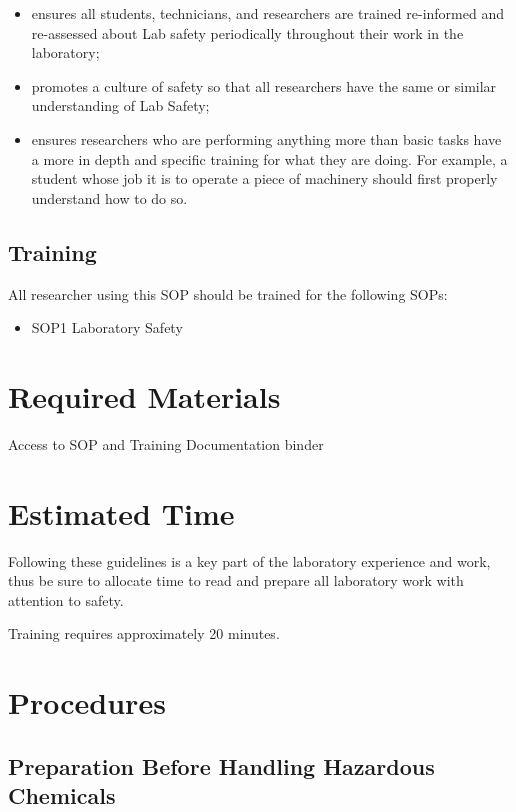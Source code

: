 \documentclass[12pt]{../SOP4_alpha}\usepackage[]{graphicx}\usepackage[]{color}
\begin{document}
\begin{itemize}
  \item ensures all students, technicians, and researchers are trained re-informed and re-assessed about Lab safety periodically throughout their work in the laboratory;
  \item promotes a culture of safety so that all researchers have the same or similar understanding of Lab Safety;
  \item ensures researchers who are performing anything more than basic tasks have a more in depth and specific training for what they are doing. For example, a student whose job it is to operate a piece of machinery should first properly understand how to do so.

\end{itemize}

\subsection*{Training}

\NP All researcher using this SOP should be trained for the following SOPs:

\begin{itemize}
  \item SOP1 Laboratory Safety
\end{itemize}

\section{Required Materials}

\NP Access to SOP and Training Documentation binder

\section{Estimated Time}

\NP Following these guidelines is a key part of the laboratory experience and work, thus be sure to allocate time to read and prepare all laboratory work with attention to safety.

\NP Training requires approximately 20 minutes.


\section{Procedures}

\subsection*{Preparation Before Handling Hazardous Chemicals}
\end{document}
